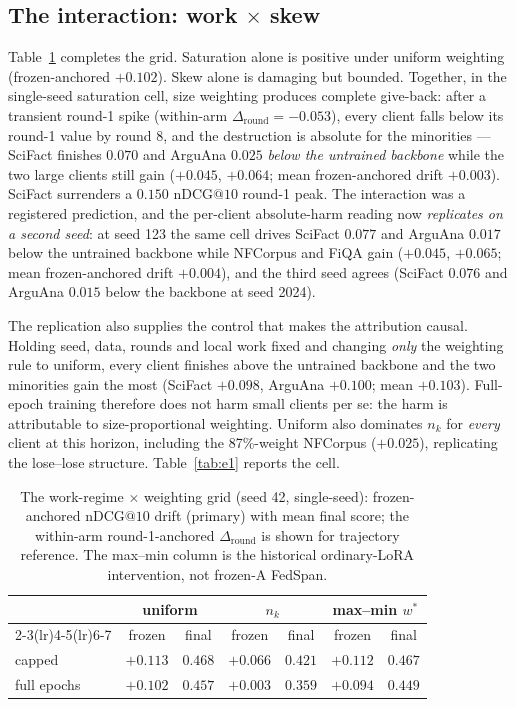 \documentclass[sigconf,anonymous,review]{acmart}
\makeatletter
\newcommand{\ndcg}{\mathrm{nDCG@10}}
\newcommand{\RoundDrift}{\Delta_{\mathrm{round}}}
\makeatother
\begin{document}
\subsection{The interaction: work $\times$ skew}
Table~\ref{tab:grid} completes the grid. Saturation alone is positive under uniform weighting (frozen-anchored $+0.102$). Skew alone is damaging but bounded. Together, in the single-seed saturation cell, size weighting produces complete give-back: after a transient round-1 spike (within-arm $\RoundDrift=-0.053$), every client falls below its round-1 value by round 8, and the destruction is absolute for the minorities --- SciFact finishes $0.070$ and ArguAna $0.025$ \emph{below the untrained backbone} while the two large clients still gain ($+0.045$, $+0.064$; mean frozen-anchored drift $+0.003$). SciFact surrenders a $0.150$ $\ndcg$ round-1 peak. The interaction was a registered prediction, and the per-client absolute-harm reading now \emph{replicates on a second seed}: at seed 123 the same cell drives SciFact $0.077$ and ArguAna $0.017$ below the untrained backbone while NFCorpus and FiQA gain ($+0.045$, $+0.065$; mean frozen-anchored drift $+0.004$), and the third seed agrees (SciFact $0.076$ and ArguAna $0.015$ below the backbone at seed 2024).

The replication also supplies the control that makes the attribution causal. Holding seed, data, rounds and local work fixed and changing \emph{only} the weighting rule to uniform, every client finishes above the untrained backbone and the two minorities gain the most (SciFact $+0.098$, ArguAna $+0.100$; mean $+0.103$). Full-epoch training therefore does not harm small clients per se: the harm is attributable to size-proportional weighting. Uniform also dominates $n_k$ for \emph{every} client at this horizon, including the 87\%-weight NFCorpus ($+0.025$), replicating the lose--lose structure. Table~\ref{tab:e1} reports the cell.

\begin{table}[t]
\caption{The work-regime $\times$ weighting grid (seed 42, single-seed): frozen-anchored $\ndcg$ drift (primary) with mean final score; the within-arm round-1-anchored $\RoundDrift$ is shown for trajectory reference. The max--min column is the historical ordinary-LoRA intervention, not frozen-A FedSpan.}
\label{tab:grid}
\begin{tabular}{lcccccc}
\toprule
 & \multicolumn{2}{c}{uniform} & \multicolumn{2}{c}{$n_k$} & \multicolumn{2}{c}{max--min $w^\ast$}\\
\cmidrule(lr){2-3}\cmidrule(lr){4-5}\cmidrule(lr){6-7}
 & frozen & final & frozen & final & frozen & final\\
\midrule
capped & $+0.113$ & $0.468$ & $+0.066$ & $0.421$ & $+0.112$ & $0.467$\\
full epochs & $+0.102$ & $0.457$ & $\mathbf{+0.003}$ & $0.359$ & $+0.094$ & $0.449$\\
\bottomrule
\end{tabular}
\end{table}
\end{document}
